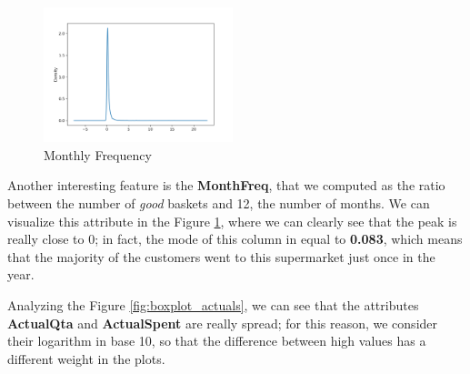 \begin{figure}
\centering
\includegraphics[width=0.49\textwidth]{img/monthfreq.png}
\caption{Monthly Frequency}
\label{fig:month_freq}
\end{figure}

Another interesting feature is the \textbf{MonthFreq}, that we computed as the ratio between the number of \emph{good} baskets and 12, the number of months. We can visualize this attribute in the Figure \ref{fig:month_freq}, where we can clearly see that the peak is really close to 0; in fact, the mode of this column in equal to \textbf{0.083}, which means that the majority of the customers went to this supermarket just once in the year.

Analyzing the Figure \ref{fig:boxplot_actuals}, we can see that the attributes \textbf{ActualQta} and \textbf{ActualSpent} are really spread; for this reason, we consider their logarithm in base 10, so that the difference between high values has a different weight in the plots.

